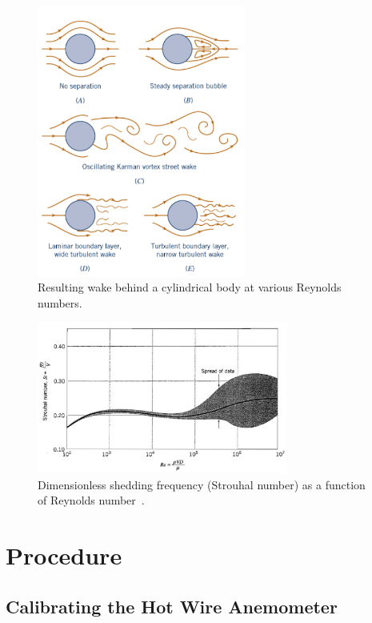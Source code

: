 \documentclass[journal,letterpaper]{IEEEtran}
\begin{document}
\begin{figure}[H]
    \centering
    \includegraphics[width=2.7in]{wake}
    \caption{Resulting wake behind a cylindrical body at various Reynolds numbers.}
    \label{fig:wake}
\end{figure}
\begin{figure}[H]
    \centering
    \includegraphics[width=3.25in]{Strouhal}
    \caption{Dimensionless shedding frequency (Strouhal number) as a function of Reynolds number~\cite{StrouhalPlot}.}
    \label{fig:strouhal}
\end{figure}

\section{Procedure}

\subsection{Calibrating the Hot Wire Anemometer}
\end{document}
